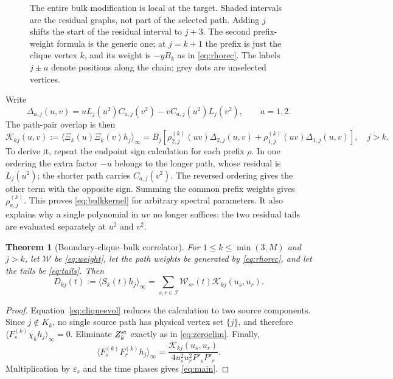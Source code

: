 \documentclass[11pt,a4paper]{article}
\newcommand{\av}[1]{\langle #1\rangle_\infty}
\newcommand{\eps}{\varepsilon}
\newcommand{\Sig}{\mathcal I}
\newcommand{\Kern}{\mathcal K}
\newcommand{\W}{\mathcal W}
\newtheorem{theorem}{Theorem}
\begin{document}
\begin{figure}[t]
\caption{The entire bulk modification is local at the target. Shaded intervals are the residual graphs, not part of the selected path. Adding $j$ shifts the start of the residual interval to $j+3$. The second prefix-weight formula is the generic one; at $j=k+1$ the prefix is just the clique vertex $k$, and its weight is $-yB_k$ as in \eqref{eq:rhorec}. The labels $j\pm a$ denote positions along the chain; grey dots are unselected vertices.}
\label{fig:tails}
\end{figure}

Write
\begin{equation}
 \Delta_{a,j}(u,v)
 =uL_j(u^2)C_{a,j}(v^2)-vC_{a,j}(u^2)L_j(v^2),\qquad a=1,2.
 \label{eq:Delta}
\end{equation}
The path-pair overlap is then
\begin{equation}
 \boxed{\Kern_{kj}(u,v):=\av{\Xi_k(u)\Xi_k(v)h_j}
 =B_j\!\left[\rho_{2,j}^{(k)}(uv)\Delta_{2,j}(u,v)
 +\rho_{1,j}^{(k)}(uv)\Delta_{1,j}(u,v)\right],\quad j>k.}
 \label{eq:bulkkernel}
\end{equation}
To derive it, repeat the endpoint sign calculation for each prefix $\rho$. In one ordering the extra factor $-u$ belongs to the longer path, whose residual is $L_j(u^2)$; the shorter path carries $C_{a,j}(v^2)$. The reversed ordering gives the other term with the opposite sign. Summing the common prefix weights gives $\rho_{a,j}^{(k)}$. This proves \eqref{eq:bulkkernel} for arbitrary spectral parameters. It also explains why a single polynomial in $uv$ no longer suffices: the two residual tails are evaluated separately at $u^2$ and $v^2$.

\begin{theorem}[Boundary-clique--bulk correlator]
For $1\le k\le\min(3,M)$ and $j>k$, let $\W$ be \eqref{eq:weight}, let the path weights be generated by \eqref{eq:rhorec}, and let the tails be \eqref{eq:tails}. Then
\begin{equation}
 \boxed{D_{kj}(t):=\av{S_k(t)h_j}
 =\sum_{s,r\in\Sig}\W_{sr}(t)\Kern_{kj}(u_s,u_r).}
 \label{eq:main}
\end{equation}
\end{theorem}
\begin{proof}
Equation~\eqref{eq:cliqueevol} reduces the calculation to two source components. Since $j\notin K_k$, no single source path has physical vertex set $\{j\}$, and therefore $\av{F_s^{(k)}\chi_kh_j}=0$. Eliminate $Z_k^{\rm st}$ exactly as in \eqref{eq:zeroelim}. Finally,
\[
 \av{F_s^{(k)}F_r^{(k)}h_j}
 =\frac{\Kern_{kj}(u_s,u_r)}{4u_s^2u_r^2P'_sP'_r}.
\]
Multiplication by $\eps_s$ and the time phases gives \eqref{eq:main}.
\end{proof}
\end{document}
